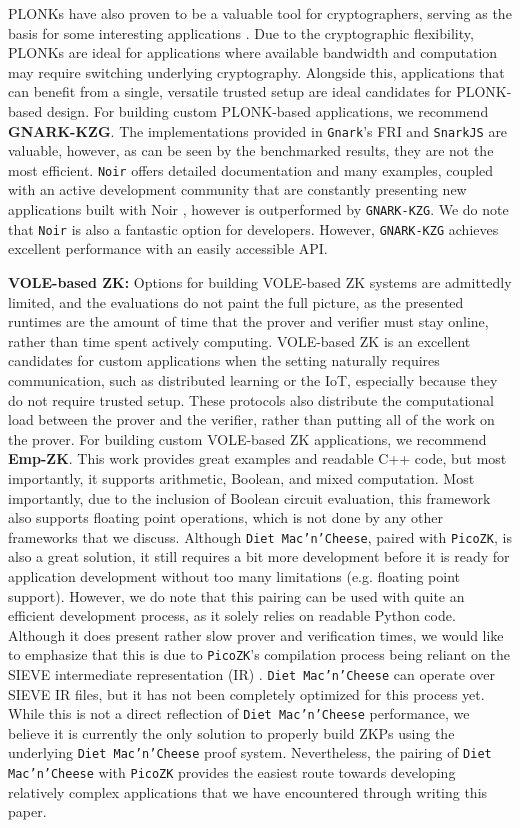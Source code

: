 PLONKs have also proven to be a valuable tool for cryptographers, serving as the basis for some interesting applications \cite{0xPolygonZero2023Plonky2}. Due to the cryptographic flexibility, PLONKs are ideal for applications where available bandwidth and computation may require switching underlying cryptography. Alongside this, applications that can benefit from a single, versatile trusted setup are ideal candidates for PLONK-based design. For building custom PLONK-based applications, we recommend \textbf{GNARK-KZG}. The implementations provided in \texttt{Gnark}'s FRI and \texttt{SnarkJS} are valuable, however, as can be seen by the benchmarked results, they are not the most efficient. \texttt{Noir} offers detailed documentation and many examples, coupled with an active development community that are constantly presenting new applications built with Noir \cite{NoirLang2023AwesomeNoirBenchmarks}, however is outperformed by \texttt{GNARK-KZG}. We do note that \texttt{Noir} is also a fantastic option for developers. However, \texttt{GNARK-KZG} achieves excellent performance with an easily accessible API. 

\textbf{VOLE-based ZK: } Options for building VOLE-based ZK systems are admittedly limited, and the evaluations do not paint the full picture, as the presented runtimes are the amount of time that the prover and verifier must stay online, rather than time spent actively computing. VOLE-based ZK is an excellent candidates for custom applications when the setting naturally requires communication, such as distributed learning or the IoT, especially because they do not require trusted setup. These protocols also distribute the computational load between the prover and the verifier, rather than putting all of the work on the prover. For building custom VOLE-based ZK applications, we recommend \textbf{Emp-ZK}. This work provides great examples and readable C++ code, but most importantly, it supports arithmetic, Boolean, and mixed computation. Most importantly, due to the inclusion of Boolean circuit evaluation, this framework also supports floating point operations, which is not done by any other frameworks that we discuss. Although \texttt{Diet Mac'n'Cheese}, paired with \texttt{PicoZK}, is also a great solution, it still requires a bit more development before it is ready for application development without too many limitations (e.g. floating point support). However, we do note that this pairing can be used with quite an efficient development process, as it solely relies on readable Python code. Although it does present rather slow prover and verification times, we would like to emphasize that this is due to \texttt{PicoZK}'s compilation process being reliant on the SIEVE intermediate representation (IR) \cite{sieve}. \texttt{Diet Mac'n'Cheese} can operate over SIEVE IR files, but it has not been completely optimized for this process yet. While this is not a direct reflection of \texttt{Diet Mac'n'Cheese} performance, we believe it is currently the only solution to properly build ZKPs using the underlying \texttt{Diet Mac'n'Cheese} proof system. Nevertheless, the pairing of \texttt{Diet Mac'n'Cheese} with \texttt{PicoZK} provides the easiest route towards developing relatively complex applications that we have encountered through writing this paper.

